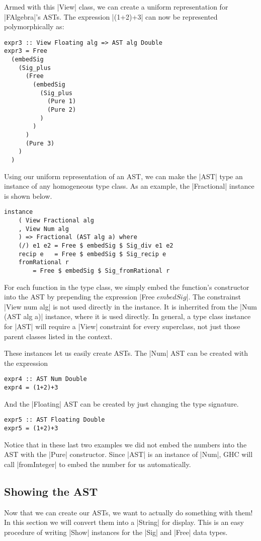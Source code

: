 \documentclass[preprint]{sigplanconf}
\theoremstyle{definition}
\begin{document}
Armed with this |View| class, we can create a uniform representation for |FAlgebra|'s ASTs.
The expression |(1+2)+3| can now be represented polymorphically as:
\begin{lstlisting}
expr3 :: View Floating alg => AST alg Double
expr3 = Free
  (embedSig
    (Sig_plus
      (Free
        (embedSig
          (Sig_plus
            (Pure 1)
            (Pure 2)
          )
        )
      )
      (Pure 3)
    )
  )
\end{lstlisting}

Using our uniform representation of an AST,
we can make the |AST| type an instance of any homogeneous type class.
As an example, the |Fractional| instance is shown below.
\begin{lstlisting}
instance
    ( View Fractional alg
    , View Num alg
    ) => Fractional (AST alg a) where
    (/) e1 e2 = Free $ embedSig $ Sig_div e1 e2
    recip e   = Free $ embedSig $ Sig_recip e
    fromRational r
        = Free $ embedSig $ Sig_fromRational r
\end{lstlisting}
For each function in the type class,
we simply embed the function's constructor into the AST by prepending the expression |Free $ embedSig $|.
The constrainst |View num alg| is not used directly in the instance.
It is inherrited from the |Num (AST alg a)| instance,
where it is used directly.
In general, a type class instance for |AST| will require a |View| constraint for every superclass,
not just those parent classes listed in the context.

These instances let us easily create ASTs.
The |Num| AST can be created with the expression
\begin{lstlisting}
expr4 :: AST Num Double
expr4 = (1+2)+3
\end{lstlisting}
And the |Floating| AST can be created by just changing the type signature.
\begin{lstlisting}
expr5 :: AST Floating Double
expr5 = (1+2)+3
\end{lstlisting}
Notice that in these last two examples we did not embed the numbers into the AST with the |Pure| constructor.
Since |AST| is an instance of |Num|,
GHC will call |fromInteger| to embed the number for us automatically.

\subsection{Showing the AST}
Now that we can create our ASTs, we want to actually do something with them!
In this section we will convert them into a |String| for display.
This is an easy procedure of writing |Show| instances for the |Sig| and |Free| data types.
\end{document}
